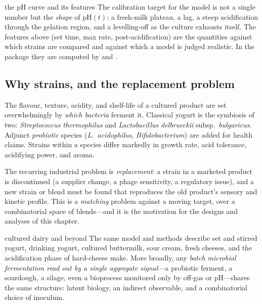 \begin{databox}{the pH curve and its features}
The calibration target for the model is not a single number but the \emph{shape}
of $\mathrm{pH}(t)$: a fresh-milk plateau, a lag, a steep acidification through
the gelation region, and a levelling-off as the culture exhausts itself. The
features above (set time, max rate, post-acidification) are the quantities against
which strains are compared and against which a model is judged realistic. In the
package they are computed by  and
.
\end{databox}

\subsection{Why strains, and the replacement problem}

The flavour, texture, acidity, and shelf-life of a cultured product are set
overwhelmingly by \emph{which bacteria} ferment it. Classical yogurt is the
symbiosis of two: \emph{Streptococcus thermophilus} and \emph{Lactobacillus
delbrueckii} subsp.\ \emph{bulgaricus}. Adjunct \emph{probiotic} species
(\emph{L.\ acidophilus}, \emph{Bifidobacterium}) are added for health claims.
Strains within a species differ markedly in growth rate, acid tolerance,
acidifying power, and aroma.

The recurring industrial problem is \emph{replacement}: a strain in a marketed
product is discontinued (a supplier change, a phage sensitivity, a regulatory
issue), and a new strain or blend must be found that reproduces the old product's
sensory and kinetic profile. This is a \emph{matching} problem against a moving
target, over a combinatorial space of blends---and it is the motivation for the
designs and analyses of this chapter.

\begin{appbox}{cultured dairy and beyond}
The same model and methods describe set and stirred yogurt, drinking yogurt,
cultured buttermilk, sour cream, fresh cheeses, and the acidification phase of
hard-cheese make. More broadly, any \emph{batch microbial fermentation read out by
a single aggregate signal}---a probiotic ferment, a sourdough, a silage, even a
bioprocess monitored only by off-gas or pH---shares the same structure: latent
biology, an indirect observable, and a combinatorial choice of inoculum.
\end{appbox}

